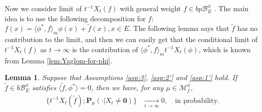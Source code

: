 \documentclass[UTF8]{pkuthss}
\theoremstyle{plain}
\newtheorem{lem}[thm]{Lemma}
\theoremstyle{definition}
\numberwithin{equation}{section}
\begin{document}
Now we consider  limit of $t^{-1} X_t(f)$ with general weight $f\in bp\mathscr B^\phi_E$ . The main idea is to use the following decomposition for $f$:
$f(x)=\langle \phi^*,f\rangle_m \phi(x)+\tilde f(x), x\in E$. The following lemma says that $\tilde f$ has no contribution to the limit, and then we can easily get that the conditional limit of $t^{-1} X_t(f)$ as $t\to\infty$ is the contribution of $\langle \phi^*,f\rangle_mt^{-1}X_t(\phi)$, which is known from Lemma \ref{lem:Yaglom-for-phi}.



\begin{lem}\label{lem:general-lemma}
	Suppose that Assumptions \ref{asp:3}, \ref{asp:2'} and \ref{asp:1'} hold.
	If $\tilde f\in b\mathscr B^\phi_E$ satisfies $\langle \tilde f, \phi^*\rangle = 0$, then we have, for any $\mu \in \mathcal M^\phi_f$,
\begin{align}
	\big\{ t^{-1} X_t(\tilde f) ; \mathbf P_\mu(\cdot|X_t \neq \mathbf 0)\big\}
	&\xrightarrow[t\to\infty]{} 0,
	\quad\text{in probability}.
\end{align}
\end{lem}
\end{document}
